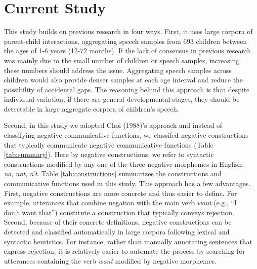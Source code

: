 \documentclass[
  man,floatsintext]{apa6}
\begin{document}
\hypertarget{current-study}{%
\section{Current Study}\label{current-study}}

This study builds on previous research in four ways. First, it uses large corpora of parent-child interactions, aggregating speech samples from 693 children between the ages of 1-6 years (12-72 months). If the lack of consensus in previous research was mainly due to the small number of children or speech samples, increasing these numbers should address the issue. Aggregating speech samples across children would also provide denser samples at each age interval and reduce the possibility of accidental gaps. The reasoning behind this approach is that despite individual variation, if there are general developmental stages, they should be detectable in large aggregate corpora of children's speech.

Second, in this study we adopted Choi (1988)'s approach and instead of classifying negative communicative functions, we classifed negative constructions that typically communicate negative communicative functions (Table \ref{tab:summary}). Here by negative constructions, we refer to syntactic constructions modified by any one of the three negative morphemes in English: \emph{no}, \emph{not}, \emph{n't}. Table \ref{tab:constructions} summarizes the constructions and communicative functions used in this study. This approach has a few advantages. First, negative constructions are more concrete and thus easier to define. For example, utterances that combine negation with the main verb \emph{want} (e.g., ``I don't want that'') constitute a construction that typically conveys rejection. Second, because of their concrete definitions, negative constructions can be detected and classified automatically in large corpora following lexical and syntactic heuristics. For instance, rather than manually annotating sentences that express rejection, it is relatively easier to automate the process by searching for utterances containing the verb \emph{want} modified by negative morphemes.
\end{document}
